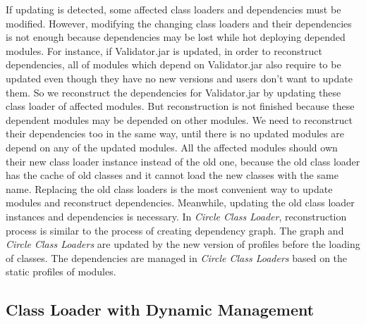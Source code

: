 \documentclass[conference]{IEEEtran}
\begin{document}
If updating is detected, some affected class loaders and dependencies must be modified.
However, modifying the changing class loaders and their dependencies is not enough because dependencies may be lost while hot deploying depended modules.
For instance, if Validator.jar is updated, in order to reconstruct dependencies, all of modules which depend on Validator.jar also require to be updated even though they have no new versions and users don't want to update them.
So we reconstruct the dependencies for Validator.jar by updating these class loader of affected modules.
But reconstruction is not finished because these dependent modules may be depended on other modules.
We need to reconstruct their dependencies too in the same way, until there is no updated modules are depend on any of the updated modules.
All the affected modules should own their new class loader instance instead of the old one, because the old class loader has the cache of old classes and it cannot load the new classes with the same name.
Replacing the old class loaders is the most convenient way to update modules and reconstruct dependencies.
Meanwhile, updating the old class loader instances and dependencies is necessary.
In \emph{Circle Class Loader}, reconstruction process is similar to the process of creating dependency graph. 
The graph and \emph{Circle Class Loaders} are updated by the new version of profiles before the loading of classes. 
The dependencies are managed in \emph{Circle Class Loaders} based on the static profiles of modules.



\subsection{Class Loader with Dynamic Management}
\end{document}
